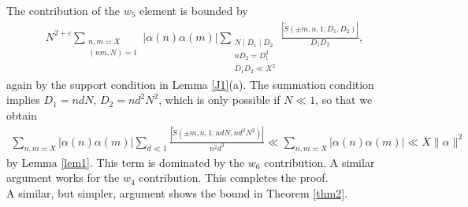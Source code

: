 \documentclass[11pt]{amsart}
\theoremstyle{plain}
\numberwithin{equation}{section}
\theoremstyle{definition}
\begin{document}
    
The contribution of the $w_5$ element is bounded by
\begin{displaymath}
\begin{split}
 N^{2+\varepsilon} \sum_{\substack{n, m \asymp X\\ (nm, N) = 1}}|\alpha(n)\alpha(m)| \sum_{\substack{N \mid D_1 \mid D_2\\ n D_2 = D_1^2\\ D_1D_2 \ll X^2}} \frac{|\tilde{S}(\pm m,  n, 1;  D_1, D_2)|}{D_1D_2},\end{split}
\end{displaymath}
again by the support condition in Lemma \ref{J1}(a).  The summation condition implies $D_1 = ndN$, $D_2 = nd^2N^2$, which is only possible if $N \ll 1$, so that we obtain
    \begin{displaymath}
\begin{split}
  \sum_{n, m \asymp X}|\alpha(n)\alpha(m)| \sum_{ d \ll 1}  \frac{|\tilde{S}(\pm m, n, 1; ndN, nd^2N^2)|}{n^2d^3}\ll   \sum_{n, m \asymp X}|\alpha(n)\alpha(m)| \ll X \| \alpha \|^2
  \end{split}
\end{displaymath}
by Lemma \ref{lem1}.   This term is dominated by the $w_6$ contribution. A similar argument works for the $w_4$ contribution. 
This completes the proof.\\
 
 A similar, but simpler, argument shows the bound in Theorem \ref{thm2}.\\
 
\end{document}
